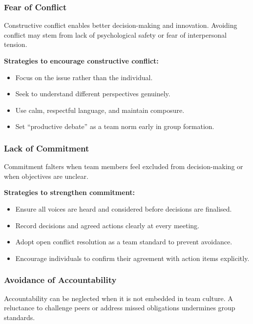 \documentclass{article}
\begin{document}
\subsubsection{Fear of Conflict}

Constructive conflict enables better decision-making and innovation. Avoiding conflict may stem from lack of psychological safety or fear of interpersonal tension.

\textbf{Strategies to encourage constructive conflict:}
\begin{itemize}
    \item Focus on the issue rather than the individual.
    \item Seek to understand different perspectives genuinely.
    \item Use calm, respectful language, and maintain composure.
    \item Set “productive debate” as a team norm early in group formation.
\end{itemize}

\subsubsection{Lack of Commitment}

Commitment falters when team members feel excluded from decision-making or when objectives are unclear.

\vspace{1em}
\textbf{Strategies to strengthen commitment:}
\begin{itemize}
    \item Ensure all voices are heard and considered before decisions are finalised.
    \item Record decisions and agreed actions clearly at every meeting.
    \item Adopt open conflict resolution as a team standard to prevent avoidance.
    \item Encourage individuals to confirm their agreement with action items explicitly.
\end{itemize}

\subsubsection{Avoidance of Accountability}

Accountability can be neglected when it is not embedded in team culture. A reluctance to challenge peers or address missed obligations undermines group standards.
\end{document}
